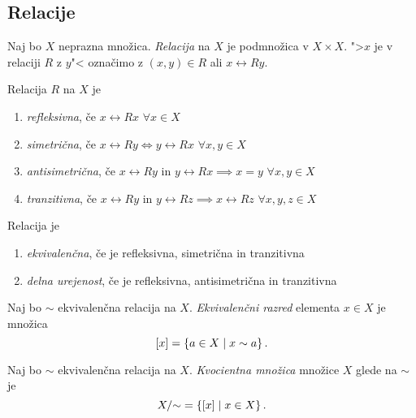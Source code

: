 \documentclass[12pt, a4paper]{article}
\begin{document}
\subsection{Relacije}

\begin{okvir}
\begin{definicija}
Naj bo $X$ neprazna množica. \emph{Relacija} na $X$ je podmnožica v $X\times X$. ">$x$ je v relaciji $R$ z $y$"< označimo z $(x,y)\in R$ ali $x\rel{R}y$.
\end{definicija}
\end{okvir}

\begin{definicija}
Relacija $R$ na $X$ je
\begin{enumerate}[label=\alph*)]
\item \emph{refleksivna}, če $x\rel{R}x$ $\forall x\in X$
\item \emph{simetrična}, če $x\rel{R}y\iff y\rel{R}x$ $\forall x,y\in X$
\item \emph{antisimetrična}, če $x\rel{R}y$ in $y\rel{R}x\implies x=y$ $\forall x,y\in X$
\item \emph{tranzitivna}, če $x\rel{R}y$ in $y\rel{R}z\implies x\rel{R}z$ $\forall x,y,z\in X$
\end{enumerate}
\end{definicija}

\begin{definicija}
Relacija je

\begin{enumerate}[label=\alph*)]
\item \emph{ekvivalenčna}, če je refleksivna, simetrična in tranzitivna
\item \emph{delna urejenost}, če je refleksivna, antisimetrična in tranzitivna
\end{enumerate}
\end{definicija}

\begin{definicija}
Naj bo $\sim$ ekvivalenčna relacija na $X$. \emph{Ekvivalenčni razred} elementa $x\in X$ je množica
\[
[x]=\left\{a\in X\mid x\sim a\right\}.
\]
\end{definicija}

\begin{definicija}
Naj bo $\sim$ ekvivalenčna relacija na $X$. \emph{Kvocientna množica} množice $X$ glede na $\sim$ je
\[
X/{\sim} =\left\{[x]\mid x\in X\right\}.
\]
\end{definicija}
\end{document}
